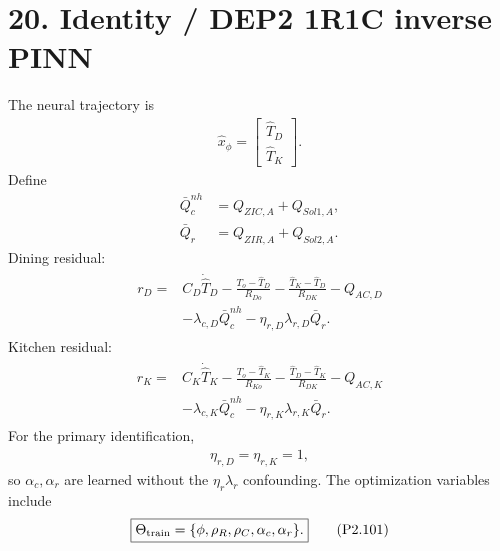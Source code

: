 \documentclass[11pt]{article}
\begin{document}
\section*{20. Identity / DEP2 1R1C inverse PINN}
The neural trajectory is
\begin{align}
\boxed{\widehat x_\phi=\begin{bmatrix}\widehat T_D\\\widehat T_K\end{bmatrix}.}
\tag{P2.97}
\end{align}
Define
\begin{align}
\bar Q_c^{nh}&=Q_{ZIC,A}+Q_{Sol1,A},\\
\bar Q_r&=Q_{ZIR,A}+Q_{Sol2,A}.
\end{align}
Dining residual:
\begin{align}
\boxed{\begin{aligned}
r_D={}&C_D\dot{\widehat T}_D-\frac{T_o-\widehat T_D}{R_{Do}}-\frac{\widehat T_K-\widehat T_D}{R_{DK}}-Q_{AC,D}\\
&-\lambda_{c,D}\bar Q_c^{nh}-\eta_{r,D}\lambda_{r,D}\bar Q_r.
\end{aligned}}
\tag{P2.98}
\end{align}
Kitchen residual:
\begin{align}
\boxed{\begin{aligned}
r_K={}&C_K\dot{\widehat T}_K-\frac{T_o-\widehat T_K}{R_{Ko}}-\frac{\widehat T_D-\widehat T_K}{R_{DK}}-Q_{AC,K}\\
&-\lambda_{c,K}\bar Q_c^{nh}-\eta_{r,K}\lambda_{r,K}\bar Q_r.
\end{aligned}}
\tag{P2.99}
\end{align}
For the primary identification,
\begin{align}
\boxed{\eta_{r,D}=\eta_{r,K}=1,}
\tag{P2.100}
\end{align}
so \(\alpha_c,\alpha_r\) are learned without the \(\eta_r\lambda_r\) confounding. The optimization variables include
\begin{align}
\boxed{\Theta_{\rm train}=\{\phi,\rho_R,\rho_C,\alpha_c,\alpha_r\}.}
\tag{P2.101}
\end{align}
\end{document}
